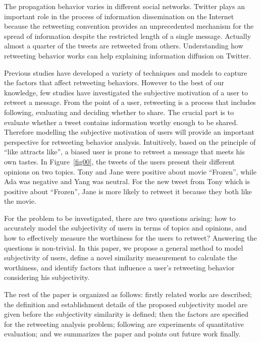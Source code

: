 \documentclass[letterpaper]{article}
\begin{document}
The propagation behavior varies in different social networks. Twitter plays an important role in the process of information dissemination on the Internet because the retweeting convention provides an unprecedented mechanism for the spread of information despite the restricted length of a single message. 
Actually almost a quarter of the tweets are retweeted from others\cite{yang2010understanding}. 
Understanding how retweeting behavior works can help explaining information diffusion on Twitter. 

Previous studies have developed a variety of techniques and models to capture the factors that affect retweeting behaviors\cite{macskassy2011people,feng2013retweet}. However to the best of our knowledge, few studies have investigated the subjective motivation of a user to retweet a message. 
From the point of a user, retweeting is a process that includes following, evaluating and deciding whether to share. The crucial part is to evaluate whether a tweet contains information worthy enough to be shared.  
Therefore modelling the subjective motivation of users will provide an important perspective for retweeting behavior analysis. 
Intuitively, based on the principle of ``like attracts like'', a biased user is prone to retweet a message that meets his own tastes. In Figure~\ref{fig00}, the tweets of the users present their different opinions on two topics. Tony and Jane were positive about movie ``Frozen'', while Ada was negative and Yang was neutral. For the new tweet from Tony which is positive about ``Frozen'', Jane is more likely to retweet it because they both like the movie. 

For the problem to be investigated, there are two questions arising: how to accurately model the subjectivity of users in terms of topics and opinions, and how to effectively measure the worthiness for the users to retweet? 
Answering the questions is non-trivial. 
In this paper, we propose a general method to model subjectivity of users, define a novel similarity measurement to calculate the worthiness,  and identify factors that influence a user's retweeting behavior considering his subjectivity. 

The rest of the paper is organized as follows: firstly related works are described; the definition and establishment details of the proposed subjectivity model are given before the subjectivity similarity is defined; then the factors are specified for the retweeting analysis problem; following are experiments of quantitative evaluation; and we summarizes the paper and points out future work finally.
\end{document}
